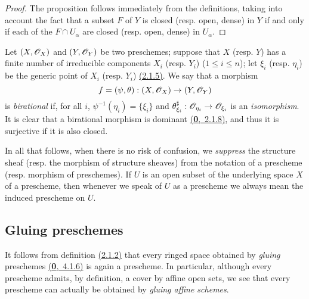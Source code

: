 \begin{proof}
\label{proof-prop-1.2.2.8}
The proposition follows immediately from the definitions, taking into
account the fact that a subset $F$ of $Y$ is closed (resp. open, dense) in $Y$
if and only if each of the $F\cap U_\alpha$ are closed (resp. open, dense) in
$U_\alpha$.
\end{proof}

\begin{env}[2.2.9]
\label{env-1.2.2.9}
Let $(X,\mathscr{O}_X)$ and $(Y,\mathscr{O}_Y)$ be two preschemes; suppose that
$X$ (resp. $Y$) has a finite number of irreducible components $X_i$ (resp.
$Y_i$) ($1\leqslant i\leqslant n$); let $\xi_i$ (resp. $\eta_i$) be the generic
point of $X_i$ (resp. $Y_i$) \hyperref[prop-1.2.1.5]{(2.1.5)}. We say that a morphism
\[
  f=(\psi,\theta):(X,\mathscr{O}_X)\to(Y,\mathscr{O}_Y)
\]
is {\it birational} if, for all $i$, $\psi^{-1}(\eta_i)=\{\xi_i\}$ and
$\theta_{\xi_i}^\sharp:\mathscr{O}_{\eta_i}\to\mathscr{O}_{\xi_i}$ is an {\it isomorphism}. It
is clear that a birational morphism is dominant \hyperref[env-0.2.1.8]{(\textbf{0},~2.1.8)}, and
thus it is surjective if it is also closed.
\end{env}

\begin{nota}[2.2.10]
\label{nota-1.2.2.10}
In all that follows, when there is
no risk of confusion, we {\it suppress} the structure sheaf (resp. the morphism
of structure sheaves) from the notation of a prescheme (resp. morphism of
preschemes). If $U$ is an open subset of the underlying space $X$ of a
prescheme, then whenever we speak of $U$ as a prescheme we always mean the
induced prescheme on $U$.
\end{nota}

\subsection{Gluing preschemes}
\label{subsection-gluing-preschemes}

\begin{env}[2.3.1]
\label{env-1.2.3.1}
It follows from definition \hyperref[defn-1.2.1.2]{(2.1.2)} that every ringed space obtained by
{\it gluing} preschemes \hyperref[env-0.4.1.6]{(\textbf{0},~4.1.6)} is again a prescheme. In particular, although
every prescheme admits, by definition, a cover by affine open sets, we see that every
prescheme can actually be obtained by {\it gluing affine schemes}.
\end{env}

